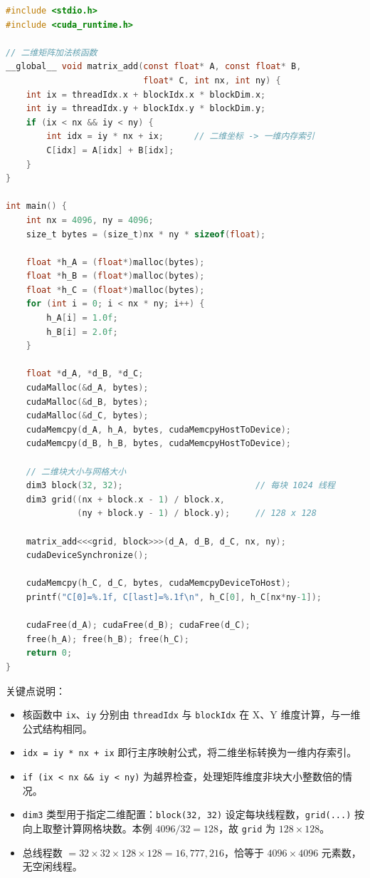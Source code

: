 \begin{lstlisting}[language=C]
#include <stdio.h>
#include <cuda_runtime.h>

// 二维矩阵加法核函数
__global__ void matrix_add(const float* A, const float* B,
                           float* C, int nx, int ny) {
    int ix = threadIdx.x + blockIdx.x * blockDim.x;
    int iy = threadIdx.y + blockIdx.y * blockDim.y;
    if (ix < nx && iy < ny) {
        int idx = iy * nx + ix;      // 二维坐标 -> 一维内存索引
        C[idx] = A[idx] + B[idx];
    }
}

int main() {
    int nx = 4096, ny = 4096;
    size_t bytes = (size_t)nx * ny * sizeof(float);

    float *h_A = (float*)malloc(bytes);
    float *h_B = (float*)malloc(bytes);
    float *h_C = (float*)malloc(bytes);
    for (int i = 0; i < nx * ny; i++) {
        h_A[i] = 1.0f;
        h_B[i] = 2.0f;
    }

    float *d_A, *d_B, *d_C;
    cudaMalloc(&d_A, bytes);
    cudaMalloc(&d_B, bytes);
    cudaMalloc(&d_C, bytes);
    cudaMemcpy(d_A, h_A, bytes, cudaMemcpyHostToDevice);
    cudaMemcpy(d_B, h_B, bytes, cudaMemcpyHostToDevice);

    // 二维块大小与网格大小
    dim3 block(32, 32);                          // 每块 1024 线程
    dim3 grid((nx + block.x - 1) / block.x,
              (ny + block.y - 1) / block.y);     // 128 x 128

    matrix_add<<<grid, block>>>(d_A, d_B, d_C, nx, ny);
    cudaDeviceSynchronize();

    cudaMemcpy(h_C, d_C, bytes, cudaMemcpyDeviceToHost);
    printf("C[0]=%.1f, C[last]=%.1f\n", h_C[0], h_C[nx*ny-1]);

    cudaFree(d_A); cudaFree(d_B); cudaFree(d_C);
    free(h_A); free(h_B); free(h_C);
    return 0;
}
\end{lstlisting}

关键点说明：

\begin{itemize}
    \item 核函数中 \texttt{ix}、\texttt{iy} 分别由 \texttt{threadIdx} 与 \texttt{blockIdx} 在 X、Y 维度计算，与一维公式结构相同。
    \item \texttt{idx = iy * nx + ix} 即行主序映射公式，将二维坐标转换为一维内存索引。
    \item \texttt{if (ix < nx \&\& iy < ny)} 为越界检查，处理矩阵维度非块大小整数倍的情况。
    \item \texttt{dim3} 类型用于指定二维配置：\texttt{block(32, 32)} 设定每块线程数，\texttt{grid(...)} 按向上取整计算网格块数。本例 $4096 / 32 = 128$，故 \texttt{grid} 为 $128 \times 128$。
    \item 总线程数 $= 32 \times 32 \times 128 \times 128 = 16{,}777{,}216$，恰等于 $4096 \times 4096$ 元素数，无空闲线程。
\end{itemize}


